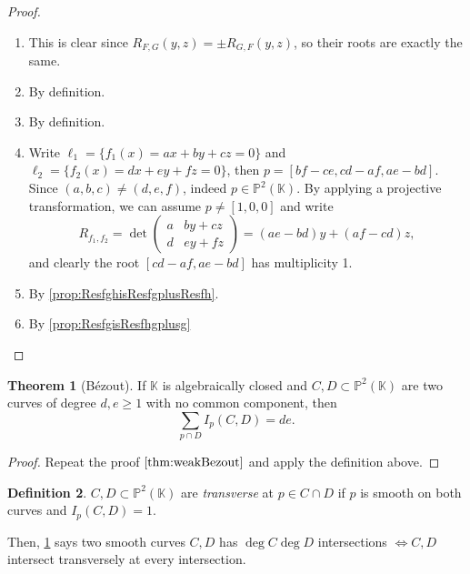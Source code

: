 \documentclass{article}
\newcommand{\K}{\mathbb{K}}
\newcommand{\p}{\mathbb{P}}
\theoremstyle{definition}
\newtheorem{defn}{Definition}[subsection]
\newtheorem{thm}[defn]{Theorem}
\begin{document}
\begin{proof}
\begin{enumerate}
\item This is clear since $R_{F,G}(y,z)=\pm R_{G,F}(y,z)$, so their roots are exactly the same.
\item By definition.
\item By definition.
\item Write $\ell_1=\{f_1(x)=ax+by+cz=0\}$ and $\ell_2=\{f_2(x)=dx+ey+fz=0\}$, then $p=[bf-ce,cd-af,ae-bd]$. Since $(a,b,c)\neq (d,e,f)$, indeed $p\in\p^2(\K)$. By applying a projective transformation, we can assume $p\neq [1,0,0]$ and write
\[
R_{f_1,f_2}=\det\begin{pmatrix}
a & by+cz \\ d & ey+fz
\end{pmatrix}=(ae-bd)y+(af-cd)z,
\]
and clearly the root $[cd-af,ae-bd]$ has multiplicity 1. 
\item By \ref{prop:ResfghisResfgplusResfh}.
\item By \ref{prop:ResfgisResfhgplusg}
\end{enumerate}
\end{proof}

\begin{thm}[Bézout]
\label{thm:strongBezout}
If $\K$ is algebraically closed and $C,D\subset\p^2(\K)$ are two curves of degree $d,e\geq 1$ with no common component, then
\[
\sum_{p\cap D}I_p(C,D)=de.
\]
\end{thm}
\begin{proof}
Repeat the proof $\ref{thm:weakBezout}$ and apply the definition above.
\end{proof}

\begin{defn}
$C,D\subset\p^2(\K)$ are \textit{transverse} at $p\in C\cap D$ if $p$ is smooth on both curves and $I_p(C,D)=1$.
\end{defn}
Then, \ref{thm:strongBezout} says two smooth curves $C,D$ has $\deg C\deg D$ intersections $\iff C,D$ intersect transversely at every intersection.
\end{document}
